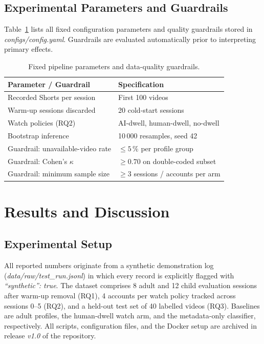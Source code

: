 \documentclass[conference]{IEEEtran}
\begin{document}
\subsection{Experimental Parameters and Guardrails}
Table~\ref{tab:params} lists all fixed configuration parameters and quality guardrails stored in \emph{configs/config.yaml}. Guardrails are evaluated automatically prior to interpreting primary effects.

\begin{table}[!t]
\caption{Fixed pipeline parameters and data-quality guardrails.}
\label{tab:params}
\centering
\begin{tabular}{@{}ll@{}}
\toprule
Parameter / Guardrail & Specification \\
\midrule
Recorded Shorts per session & First 100 videos \\
Warm-up sessions discarded & 20 cold-start sessions \\
Watch policies (RQ2) & AI-dwell, human-dwell, no-dwell \\
Bootstrap inference & 10\,000 resamples, seed 42 \\
Guardrail: unavailable-video rate & $\le 5\,\%$ per profile group \\
Guardrail: Cohen's $\kappa$ & $\ge 0.70$ on double-coded subset \\
Guardrail: minimum sample size & $\ge 3$ sessions / accounts per arm \\
\bottomrule
\end{tabular}
\end{table}

\section{Results and Discussion}\label{sec:results}
\subsection{Experimental Setup}
All reported numbers originate from a synthetic demonstration log (\emph{data/raw/test\_run.jsonl}) in which every record is explicitly flagged with \emph{``synthetic'': true}. The dataset comprises 8 adult and 12 child evaluation sessions after warm-up removal (RQ1), 4 accounts per watch policy tracked across sessions 0--5 (RQ2), and a held-out test set of 40 labelled videos (RQ3). Baselines are adult profiles, the human-dwell watch arm, and the metadata-only classifier, respectively. All scripts, configuration files, and the Docker setup are archived in release \emph{v1.0} of the repository.
\end{document}
